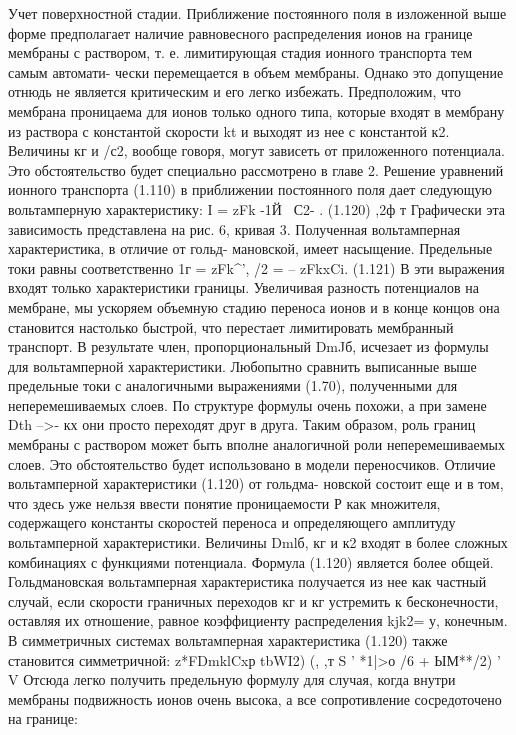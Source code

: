 Учет поверхностной стадии. Приближение постоянного поля в изложенной выше форме предполагает наличие равновесного распределения ионов на границе мембраны с раствором, т. е. лимитирующая стадия ионного транспорта тем самым автомати-
чески перемещается в объем мембраны. Однако это допущение отнюдь не является критическим и его легко избежать. Предположим, что мембрана проницаема для ионов только одного типа, которые входят в мембрану из раствора с константой скорости kt и выходят из нее с константой к2. Величины кг и /с2, вообще говоря, могут зависеть от приложенного потенциала. Это обстоятельство будет специально рассмотрено в главе 2. Решение уравнений ионного транспорта (1.110) в приближении постоянного поля дает следующую вольтамперную характеристику:
I = zFk -1Й~ С2-   . (1.120)
,2ф
т
Графически эта зависимость представлена на рис. 6, кривая 3. Полученная вольтамперная характеристика, в отличие от гольд- мановской, имеет насыщение. Предельные токи равны соответственно
1г = zFk^', /2 = -- zFkxCi. (1.121)
В эти выражения входят только характеристики границы. Увеличивая разность потенциалов на мембране, мы ускоряем объемную стадию переноса ионов и в конце концов она становится настолько быстрой, что перестает лимитировать мембранный транспорт. В результате член, пропорциональный DmJб, исчезает из формулы для вольтамперной характеристики. Любопытно сравнить выписанные выше предельные токи с аналогичными выражениями (1.70), полученными для неперемешиваемых слоев. По структуре формулы очень похожи, а при замене Dth -->- кх они просто переходят друг в друга. Таким образом, роль границ мембраны с раствором может быть вполне аналогичной роли неперемешиваемых слоев. Это обстоятельство будет использовано в модели переносчиков.
Отличие вольтамперной характеристики (1.120) от гольдма- новской состоит еще и в том, что здесь уже нельзя ввести понятие проницаемости Р как множителя, содержащего константы скоростей переноса и определяющего амплитуду вольтамперной характеристики. Величины Dmlб, кг и к2 входят в более сложных комбинациях с функциями потенциала. Формула (1.120) является более общей. Гольдмановская вольтамперная характеристика получается из нее как частный случай, если скорости граничных переходов кг и кг устремить к бесконечности, оставляя их отношение, равное коэффициенту распределения kjk2= у, конечным.
В симметричных системах вольтамперная характеристика (1.120) также становится симметричной:
z*FDmklCxр tbWI2) (, ,т
S ' *1|>о /6 + ЫМ**/2) ' V
Отсюда легко получить предельную формулу для случая, когда внутри мембраны подвижность ионов очень высока, а все сопротивление сосредоточено на границе:
